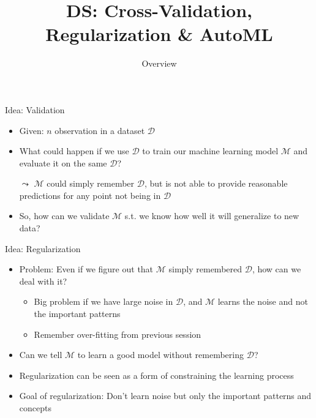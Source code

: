 \documentclass[aspectratio=169]{../latex_main/tntbeamer}  %
\title[Introduction]{DS: Cross-Validation, Regularization & AutoML}
\subtitle{Overview}
\begin{document}
	
	\maketitle
	\begin{frame}[c]{Idea: Validation}
	    
	    \begin{itemize}
	        \item Given: $n$ observation in a dataset $\mathcal{D}$
	        \item What could happen if we use $\mathcal{D}$ to train our machine learning model $\mathcal{M}$ and evaluate it on the same $\mathcal{D}$?
	        \pause
	        \item[$\leadsto$] $\mathcal{M}$ could simply remember $\mathcal{D}$, but is not able to provide reasonable predictions for any point not being in $\mathcal{D}$
	        \bigskip
	        \pause
	        \item So, how can we validate $\mathcal{M}$ s.t. we know how well it will generalize to new data?
	    
	    \end{itemize}
	    
	    
	\end{frame}
	
	\begin{frame}[c]{Idea: Regularization}
	    
	    \begin{itemize}
	        \item Problem: Even if we figure out that $\mathcal{M}$ simply remembered $\mathcal{D}$, how can we deal with it?
	        \begin{itemize}
	            \item Big problem if we have large noise in $\mathcal{D}$, and $\mathcal{M}$ learns the noise and not the important patterns
	            \item Remember \alert{over-fitting} from previous session
	        \end{itemize}
	        \pause
	        \bigskip
	        \item Can we tell $\mathcal{M}$ to learn a good model without remembering $\mathcal{D}$?
	        \item Regularization can be seen as a form of constraining the learning process
	        \item Goal of regularization: Don't learn noise but only the important patterns and concepts
	    \end{itemize}
	\end{frame}
	
\end{document}
